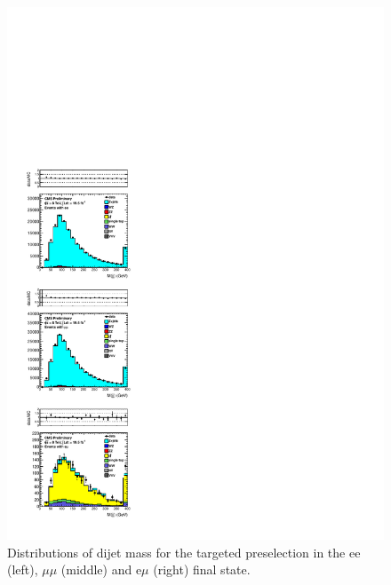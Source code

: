 \clearpage

\begin{figure}[hbt]
  \begin{center}
	\includegraphics[width=1.0\linewidth]{plots/mjj_targeted_19p5fb.pdf}
	\caption{
	  \label{fig:mjj}\protect 
Distributions of dijet mass for the targeted preselection in the ee (left), $\mu\mu$ (middle) and e$\mu$ (right) final state.
}                   
  \end{center}
\end{figure}


